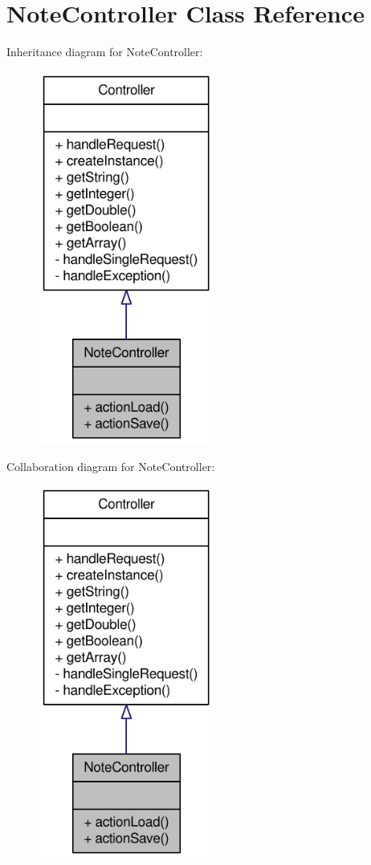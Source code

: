 \hypertarget{classNoteController}{
\section{NoteController Class Reference}
\label{classNoteController}
}


Inheritance diagram for NoteController:\nopagebreak
\begin{figure}[H]
\begin{center}
\leavevmode
\includegraphics[width=164pt]{classNoteController__inherit__graph}
\end{center}
\end{figure}


Collaboration diagram for NoteController:\nopagebreak
\begin{figure}[H]
\begin{center}
\leavevmode
\includegraphics[width=164pt]{classNoteController__coll__graph}
\end{center}
\end{figure}
